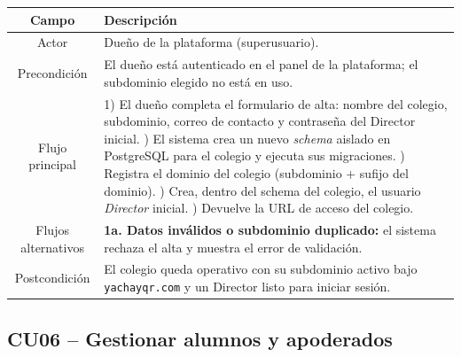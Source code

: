 \documentclass[a4paper,12pt]{article}
\begin{document}
\begin{table}[H]
\centering
\begin{tabularx}{\linewidth}{C X}
\toprule
\textbf{Campo} & \textbf{Descripción} \\
\midrule
Actor & Dueño de la plataforma (superusuario). \\
\addlinespace
Precondición &
  El dueño está autenticado en el panel de la plataforma; el subdominio
  elegido no está en uso. \\
\addlinespace
Flujo principal &
  1) El dueño completa el formulario de alta: nombre del colegio, subdominio,
     correo de contacto y contraseña del Director inicial. ) El sistema crea un nuevo \textit{schema} aislado en PostgreSQL para el
     colegio y ejecuta sus migraciones. ) Registra el dominio del colegio (subdominio + sufijo del dominio). ) Crea, dentro del schema del colegio, el usuario \textit{Director} inicial.
     ) Devuelve la URL de acceso del colegio. \\
\addlinespace
Flujos alternativos &
  \textbf{1a. Datos inválidos o subdominio duplicado:} el sistema rechaza el
  alta y muestra el error de validación. \\
\addlinespace
Postcondición &
  El colegio queda operativo con su subdominio activo bajo
  \texttt{yachayqr.com} y un Director listo para iniciar sesión. \\
\bottomrule
\end{tabularx}
\end{table}

\subsection{CU06 -- Gestionar alumnos y apoderados}
\end{document}
